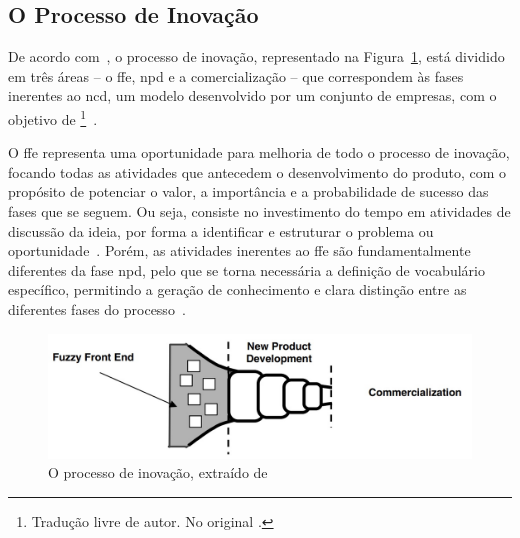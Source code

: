 \subsection{O Processo de Inovação}

De acordo com~\textcite{ffe_effectivemethods_tools_techniques}, o processo de inovação, representado na Figura~\ref{fig:inovation_process}, está dividido em três áreas -- o \gls{ffe}, \gls{npd} e a comercialização -- que correspondem às fases inerentes ao \gls{ncd}, um modelo desenvolvido por um conjunto de empresas, com o objetivo de \footnote{Tradução livre de autor. No original .}~\parencite{providing_clarity_common_language_ffe}.

O \gls{ffe} representa uma oportunidade para melhoria de todo o processo de inovação, focando todas as atividades que antecedem o desenvolvimento do produto, com o propósito de potenciar o valor, a importância e a probabilidade de sucesso das fases que se seguem. Ou seja, consiste no investimento do tempo em atividades de discussão da ideia, por forma a identificar e estruturar o problema ou oportunidade~\parencite{ffe_effectivemethods_tools_techniques, ffe_theoretical_model}. Porém, as atividades inerentes ao \gls{ffe} são fundamentalmente diferentes da fase \gls{npd}, pelo que se torna necessária a definição de vocabulário específico, permitindo a geração de conhecimento e clara distinção entre as diferentes fases do processo~\parencite{ffe_effectivemethods_tools_techniques}.

\begin{figure}[!ht]
    \centering
    \includegraphics[width=.95\textwidth]{ch02/assets/inovation_process.jpg}
    \caption{O processo de inovação, extraído de~\textcite{ffe_effectivemethods_tools_techniques}}
    \label{fig:inovation_process}
\end{figure}

